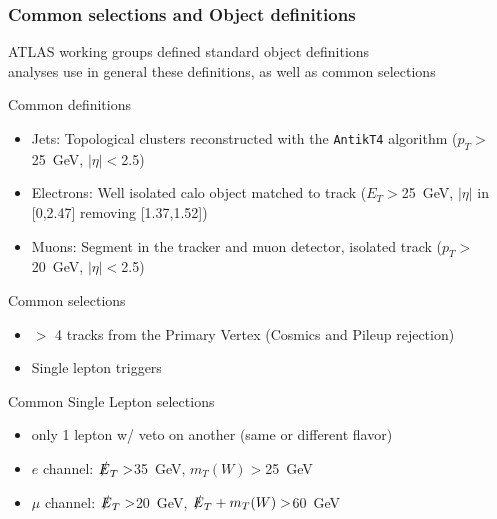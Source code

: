 \documentclass[xcolor=dvipsnames,10pt]{beamer}
\begin{document}
\begin{frame}\frametitle{Common selections and Object definitions}
\footnotesize\centering

ATLAS working groups defined standard object definitions\\
analyses use in general these definitions, as well as common selections\\

\vspace{\baselineskip}

\begin{minipage}{.5\textwidth}
\centering
\alert{Common definitions}

\begin{itemize}\scriptsize
\item \alert{Jets}: Topological clusters reconstructed with the \texttt{AntikT4} algorithm ($p_T > $25~GeV, $|\eta|<$2.5)
\item \alert{Electrons}: Well isolated calo object matched to track ($E_T>$25~GeV, $|\eta|$ in [0,2.47] removing [1.37,1.52])
\item \alert{Muons}: Segment in the tracker and muon detector, isolated track ($p_T>$ 20~GeV, $|\eta|<$2.5)
\end{itemize}

\alert{Common selections}
\begin{itemize}\scriptsize
\item $>$ 4 tracks from the Primary Vertex (Cosmics and Pileup rejection)
\item Single lepton triggers
\end{itemize}

\end{minipage}\begin{minipage}{.5\textwidth}
\centering


\begin{minipage}{.9\textwidth}
\centering
\alert{Common Single Lepton selections}

\begin{itemize}\scriptsize
\item only 1 lepton w/ veto on another (same or different flavor)
\item $e$ channel: $\slashed{E}_T>$35~GeV, $m_T(W)>$25~GeV
\item $\mu$ channel: $\slashed{E}_T>$20~GeV, $\slashed{E}_T + m_T(W)>$60~GeV
\end{itemize}


\end{minipage}
\end{minipage}
\end{frame}
\end{document}

